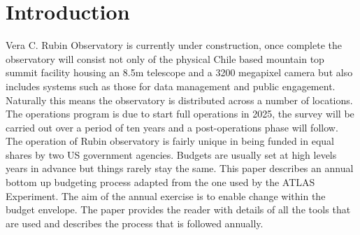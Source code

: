\section{Introduction} \label{sec:intro}
Vera C. Rubin Observatory\cite{2008arXiv0805.2366I} is currently under construction, once complete the observatory will consist not only of the  physical Chile based mountain top summit facility housing an 8.5m telescope and a 3200 megapixel camera but also includes systems such as those for data management and public engagement. Naturally this means the observatory is distributed across a number of locations. The operations program is due to start full operations in 2025, the survey will be carried out over a period of ten years and a post-operations phase will follow. The operation of Rubin observatory is fairly unique in being funded in equal shares by two US government agencies. Budgets are usually set at high levels years in advance but things rarely stay the same. This paper describes an annual bottom up budgeting process adapted from the one used by the ATLAS Experiment. The aim of the annual exercise is to enable change within the budget envelope.
The paper provides the reader with details of all the tools that are used and describes the process that is followed annually.

